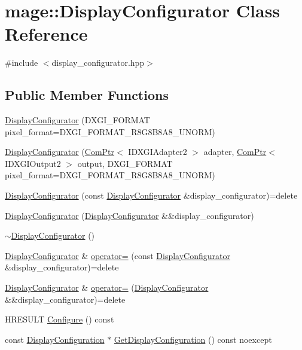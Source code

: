 \hypertarget{classmage_1_1_display_configurator}{}\section{mage\+:\+:Display\+Configurator Class Reference}
\label{classmage_1_1_display_configurator}


{\ttfamily \#include $<$display\+\_\+configurator.\+hpp$>$}

\subsection*{Public Member Functions}
\begin{DoxyCompactItemize}
\item 
\hyperlink{classmage_1_1_display_configurator_ac6bac899c25247f90aa494eb6f0cb139}{Display\+Configurator} (D\+X\+G\+I\+\_\+\+F\+O\+R\+M\+AT pixel\+\_\+format=D\+X\+G\+I\+\_\+\+F\+O\+R\+M\+A\+T\+\_\+\+R8\+G8\+B8\+A8\+\_\+\+U\+N\+O\+RM)
\item 
\hyperlink{classmage_1_1_display_configurator_ae801ce141918061a6f62d19744fbad72}{Display\+Configurator} (\hyperlink{namespacemage_ae74f374780900893caa5555d1031fd79}{Com\+Ptr}$<$ I\+D\+X\+G\+I\+Adapter2 $>$ adapter, \hyperlink{namespacemage_ae74f374780900893caa5555d1031fd79}{Com\+Ptr}$<$ I\+D\+X\+G\+I\+Output2 $>$ output, D\+X\+G\+I\+\_\+\+F\+O\+R\+M\+AT pixel\+\_\+format=D\+X\+G\+I\+\_\+\+F\+O\+R\+M\+A\+T\+\_\+\+R8\+G8\+B8\+A8\+\_\+\+U\+N\+O\+RM)
\item 
\hyperlink{classmage_1_1_display_configurator_a20d8fa60a9d511a114e603dddf1a3716}{Display\+Configurator} (const \hyperlink{classmage_1_1_display_configurator}{Display\+Configurator} \&display\+\_\+configurator)=delete
\item 
\hyperlink{classmage_1_1_display_configurator_aacf6436e2b16f883684826fe0ad0abdd}{Display\+Configurator} (\hyperlink{classmage_1_1_display_configurator}{Display\+Configurator} \&\&display\+\_\+configurator)
\item 
\hyperlink{classmage_1_1_display_configurator_af6546383269503e3cab077e4bf54556e}{$\sim$\+Display\+Configurator} ()
\item 
\hyperlink{classmage_1_1_display_configurator}{Display\+Configurator} \& \hyperlink{classmage_1_1_display_configurator_adf24194f83a0971a1c3076c1a23d1699}{operator=} (const \hyperlink{classmage_1_1_display_configurator}{Display\+Configurator} \&display\+\_\+configurator)=delete
\item 
\hyperlink{classmage_1_1_display_configurator}{Display\+Configurator} \& \hyperlink{classmage_1_1_display_configurator_a9d98a955cdbaf3bfe8913a4b561ad08d}{operator=} (\hyperlink{classmage_1_1_display_configurator}{Display\+Configurator} \&\&display\+\_\+configurator)=delete
\item 
H\+R\+E\+S\+U\+LT \hyperlink{classmage_1_1_display_configurator_aa84373fba5d7806f065f7633a03f7d64}{Configure} () const
\item 
const \hyperlink{structmage_1_1_display_configuration}{Display\+Configuration} $\ast$ \hyperlink{classmage_1_1_display_configurator_a9371158cf1e2686f43ece9e1a53ee3b6}{Get\+Display\+Configuration} () const noexcept
\end{DoxyCompactItemize}
